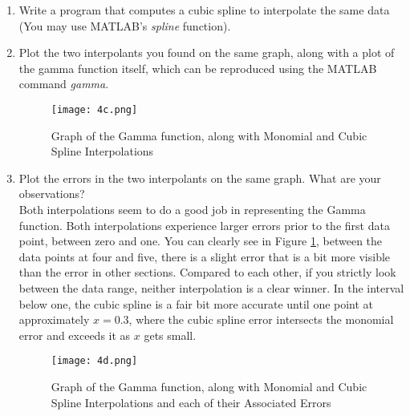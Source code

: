 \documentclass{article}
\begin{document}
\begin{enumerate}[label = {\arabic*}]
\begin{enumerate}
			
			
			\pagebreak
			
			\item Write a program that computes a cubic spline to interpolate the same data (You may use MATLAB's \textit{spline} function).

			
			
			\item Plot the two interpolants you found on the same graph, along with a plot of the gamma function itself, which can be reproduced using the MATLAB command \textit{gamma}.
			
			
			
			\begin{figure}[h!]
				\centering
				\caption{Graph of the Gamma function, along with Monomial and Cubic Spline Interpolations}
				\texttt{[image: 4c.png]}
			\end{figure}
			
			\item Plot the errors in the two interpolants on the same graph. What are your observations? \\

			\hspace{15pt} Both interpolations seem to do a good job in representing the Gamma function. Both interpolations experience larger errors prior to the first data point, between zero and one. You can clearly see in Figure \ref{fig:gamma}, between the data points at four and five, there is a slight error that is a bit more visible than the error in other sections. Compared to each other, if you strictly look between the data range, neither interpolation is a clear winner. In the interval below one, the cubic spline is a fair bit more accurate until one point at approximately $x = 0.3$, where the cubic spline error intersects the monomial error and exceeds it as $x$ gets small. 
			
			\begin{figure}[h!]
				\centering
				\caption{Graph of the Gamma function, along with Monomial and Cubic Spline Interpolations and each of their Associated Errors}
				\texttt{[image: 4d.png]}
				\label{fig:gamma}
			\end{figure}
			

\end{enumerate}
\end{enumerate}
\end{document}
